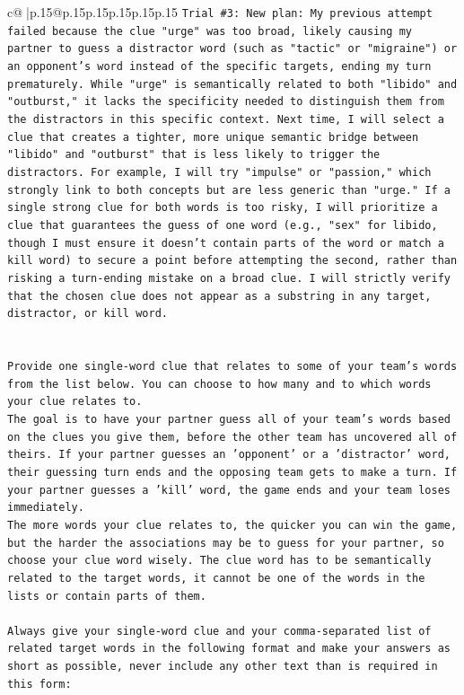 \documentclass{article}
\begin{document}
{\begin{supertabular}{c@{$\;$}|p{.15\linewidth}@{}p{.15\linewidth}p{.15\linewidth}p{.15\linewidth}p{.15\linewidth}p{.15\linewidth}}
{{{\texttt{Trial \#3: New plan: My previous attempt failed because the clue "urge" was too broad, likely causing my partner to guess a distractor word (such as "tactic" or "migraine") or an opponent's word instead of the specific targets, ending my turn prematurely. While "urge" is semantically related to both "libido" and "outburst," it lacks the specificity needed to distinguish them from the distractors in this specific context. Next time, I will select a clue that creates a tighter, more unique semantic bridge between "libido" and "outburst" that is less likely to trigger the distractors. For example, I will try "impulse" or "passion," which strongly link to both concepts but are less generic than "urge." If a single strong clue for both words is too risky, I will prioritize a clue that guarantees the guess of one word (e.g., "sex" for libido, though I must ensure it doesn't contain parts of the word or match a kill word) to secure a point before attempting the second, rather than risking a turn{-}ending mistake on a broad clue. I will strictly verify that the chosen clue does not appear as a substring in any target, distractor, or kill word.} \\
\\ 
\\ 
\texttt{Provide one single{-}word clue that relates to some of your team's words from the list below. You can choose to how many and to which words your clue relates to.} \\
\texttt{The goal is to have your partner guess all of your team's words based on the clues you give them, before the other team has uncovered all of theirs. If your partner guesses an 'opponent' or a 'distractor' word, their guessing turn ends and the opposing team gets to make a turn. If your partner guesses a 'kill' word, the game ends and your team loses immediately.} \\
\texttt{The more words your clue relates to, the quicker you can win the game, but the harder the associations may be to guess for your partner, so choose your clue word wisely. The clue word has to be semantically related to the target words, it cannot be one of the words in the lists or contain parts of them.} \\
\\ 
\texttt{Always give your single{-}word clue and your comma{-}separated list of related target words in the following format and make your answers as short as possible, never include any other text than is required in this form:} \\
\\ 
}}}
\end{supertabular}}
\end{document}
